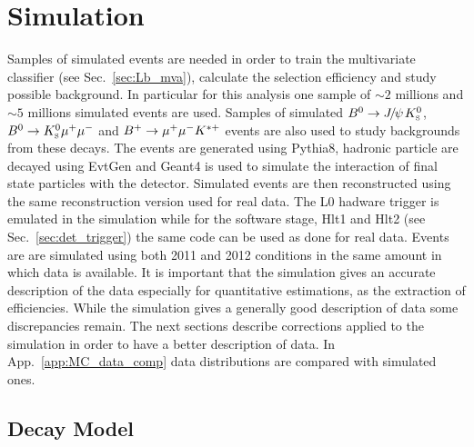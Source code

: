 \section{Simulation}
\label{sec:Lb_simulation}

Samples of simulated events are needed in order to train the multivariate classifier
(see Sec.~\ref{sec:Lb_mva}), calculate the selection efficiency and study possible background.
In particular for this analysis one sample of $\sim 2$ millions \Lb\to\jpsi\Lz and 
$\sim 5$ millions \Lb\to\Lz\mumu simulated events are used.
Samples of simulated $\Bz\ra\jpsi\KS$, $B^0\rightarrow K^0_{\rm\scriptscriptstyle S}\mu^+\mu^-$ and $B^{+} \rightarrow\mu^+\mu^- K^{*+}$
events are also used to study backgrounds from these decays. The events are generated using
Pythia8, hadronic particle are decayed using EvtGen and Geant4 is used to simulate
the interaction of final state particles with the detector. Simulated events are then
reconstructed using the same reconstruction version used for real data. The L0 hadware
trigger is emulated in the simulation while for the software stage, Hlt1 and Hlt2
(see Sec.~\ref{sec:det_trigger}) the same code can be used as done for real data.
Events are are simulated using both 2011 and 2012 conditions in the same amount in which data is available.
It is important that the simulation gives an accurate description of the data especially
for quantitative estimations, as the extraction of efficiencies. While the simulation
gives a generally good description of data some discrepancies remain. The next sections
describe corrections applied to the simulation in order to have a better description of data.
In App.~\ref{app:MC_data_comp} data distributions are compared with simulated ones.

\subsection{Decay Model}
\label{decaymodel}

